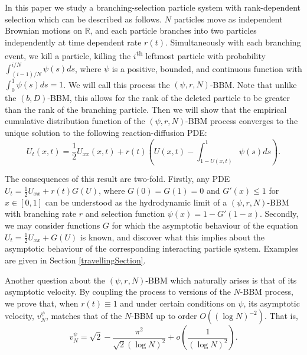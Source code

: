 \documentclass{article}
\newcommand{\B}[1]{\mathbb{#1}}
\begin{document}
In this paper we study a branching-selection particle system with rank-dependent selection which can be described as follows. $N$ particles move as independent Brownian motions on $\B{R}$, and each particle branches into two particles independently at time dependent rate $r(t)$. Simultaneously with each branching event, we kill a particle, killing the $i$\textsuperscript{th} leftmost particle with probability $\int_{(i-1)/N}^{i/N}\psi(s)ds$, where $\psi$ is a positive, bounded, and continuous function with $\int_0^1 \psi(s)ds=1$. We will call this process the $(\psi,r,N)$-BBM. Note that unlike the $(b,D)$-BBM, this allows for the rank of the deleted particle to be greater than the rank of the branching particle. Then we will show that the empirical cumulative distribution function of the $(\psi,r,N)$-BBM process converges to the unique solution to the following reaction-diffusion PDE:
\begin{equation} \label{PDEinIntro} U_t(x,t)=\frac12U_{xx}(x,t)+r(t)\left(U(x,t)-\int_{1-U(x,t)}^1 \psi(s)ds\right).\end{equation}

The consequences of this result are two-fold. Firstly, any PDE $U_t = \frac12 U_{xx} + r(t)G(U)$, where $G(0)=G(1)=0$ and $G'(x)\leq 1$ for $x\in [0,1]$ can be understood as the hydrodynamic limit of a $(\psi,r,N)$-BBM with branching rate $r$ and selection function $\psi(x)=1-G'(1-x)$. Secondly, we may consider functions $G$ for which the asymptotic behaviour of the equation $U_t = \frac12 U_{xx} + G(U)$ is known, and discover what this implies about the asymptotic behaviour of the corresponding interacting particle system. Examples are given in Section \ref{travellingSection}. 

Another question about the $(\psi,r,N)$-BBM which naturally arises is that of its asymptotic velocity. By coupling the process to versions of the $N$-BBM process, we prove that, when $r(t)\equiv 1$ and under certain conditions on $\psi$, its asymptotic velocity, $v^\psi_N$, matches that of the $N$-BBM up to order $O((\log N)^{-2})$. That is,
$$v^\psi_N = \sqrt{2} - \frac{\pi^2}{\sqrt{2}(\log N)^2} + o\left(\frac{1}{(\log N)^2}\right).$$
\end{document}
